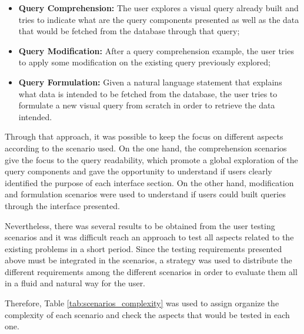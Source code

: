 \begin{itemize}
    \item \textbf{Query Comprehension: } The user explores a visual query already built and tries to indicate what are the query components presented as well as the data that would be fetched from the database through that query;
    \item \textbf{Query Modification: } After a query comprehension example, the user tries to apply some modification on the existing query previously explored;
    \item \textbf{Query Formulation: } Given a natural language statement that explains what data is intended to be fetched from the database, the user tries to formulate a new visual query from scratch in order to retrieve the data intended.
\end{itemize}

Through that approach, it was possible to keep the focus on different aspects according to the scenario used. On the one hand, the comprehension scenarios give the focus to the query readability, which promote a global exploration of the query components and gave the opportunity to understand if users clearly identified the purpose of each interface section. On the other hand, modification and formulation scenarios were used to understand if users could built queries through the interface presented.

Nevertheless, there was several results to be obtained from the user testing scenarios and it was difficult reach an approach to test all aspects related to the existing problems in a short period. Since the testing requirements presented above must be integrated in the scenarios, a strategy was used to distribute the different requirements among the different scenarios in order to evaluate them all in a fluid and natural way for the user. 


Therefore, Table \ref{tab:scenarios_complexity} was used to assign organize the complexity of each scenario and check the aspects that would be tested in each one.

